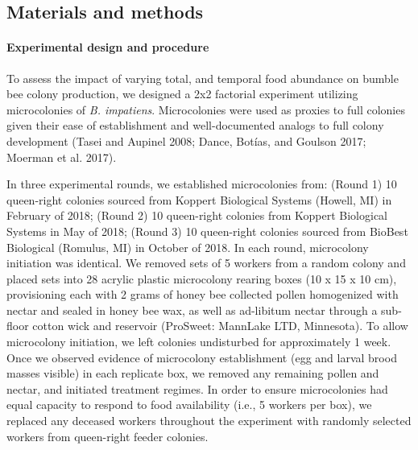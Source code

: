 \documentclass[11pt,]{article}
\let\oldparagraph\paragraph
\renewcommand{\paragraph}[1]{\oldparagraph{#1}\mbox{}}
\begin{document}
\hypertarget{materials-and-methods}{%
\subsection{Materials and methods}\label{materials-and-methods}}

\hypertarget{experimental-design-and-procedure}{%
\paragraph{Experimental design and
procedure}\label{experimental-design-and-procedure}}

To assess the impact of varying total, and temporal food abundance on
bumble bee colony production, we designed a 2x2 factorial experiment
utilizing microcolonies of \emph{B. impatiens}. Microcolonies were used
as proxies to full colonies given their ease of establishment and
well-documented analogs to full colony development (Tasei and Aupinel
2008; Dance, Botías, and Goulson 2017; Moerman et al. 2017).

In three experimental rounds, we established microcolonies from: (Round
1) 10 queen-right colonies sourced from Koppert Biological Systems
(Howell, MI) in February of 2018; (Round 2) 10 queen-right colonies from
Koppert Biological Systems in May of 2018; (Round 3) 10 queen-right
colonies sourced from BioBest Biological (Romulus, MI) in October of
2018. In each round, microcolony initiation was identical. We removed
sets of 5 workers from a random colony and placed sets into 28 acrylic
plastic microcolony rearing boxes (10 x 15 x 10 cm), provisioning each
with 2 grams of honey bee collected pollen homogenized with nectar and
sealed in honey bee wax, as well as ad-libitum nectar through a
sub-floor cotton wick and reservoir (ProSweet: MannLake LTD, Minnesota).
To allow microcolony initiation, we left colonies undisturbed for
approximately 1 week. Once we observed evidence of microcolony
establishment (egg and larval brood masses visible) in each replicate
box, we removed any remaining pollen and nectar, and initiated treatment
regimes. In order to ensure microcolonies had equal capacity to respond
to food availability (i.e., 5 workers per box), we replaced any deceased
workers throughout the experiment with randomly selected workers from
queen-right feeder colonies.
\end{document}
